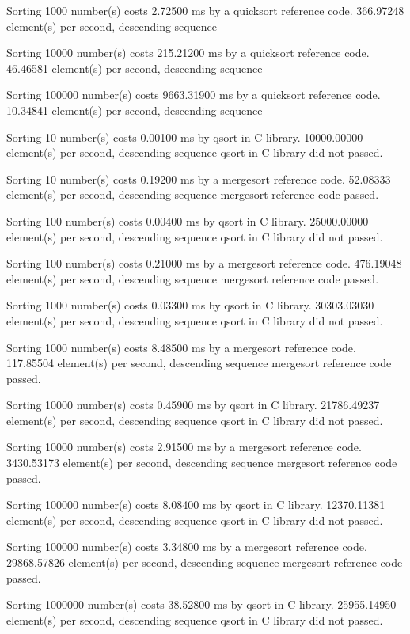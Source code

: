 \documentclass[12pt]{article}
\begin{document}
Sorting 1000 number(s) costs 2.72500 ms by a quicksort reference code. 366.97248 element(s) per second, descending sequence

Sorting 10000 number(s) costs 215.21200 ms by a quicksort reference code. 46.46581 element(s) per second, descending sequence

Sorting 100000 number(s) costs 9663.31900 ms by a quicksort reference code. 10.34841 element(s) per second, descending sequence

Sorting 10 number(s) costs 0.00100 ms by qsort in C library. 10000.00000 element(s) per second, descending sequence
qsort in C library did not passed.

Sorting 10 number(s) costs 0.19200 ms by a mergesort reference code. 52.08333 element(s) per second, descending sequence
mergesort reference code passed.

Sorting 100 number(s) costs 0.00400 ms by qsort in C library. 25000.00000 element(s) per second, descending sequence
qsort in C library did not passed.

Sorting 100 number(s) costs 0.21000 ms by a mergesort reference code. 476.19048 element(s) per second, descending sequence
mergesort reference code passed.

Sorting 1000 number(s) costs 0.03300 ms by qsort in C library. 30303.03030 element(s) per second, descending sequence
qsort in C library did not passed.

Sorting 1000 number(s) costs 8.48500 ms by a mergesort reference code. 117.85504 element(s) per second, descending sequence
mergesort reference code passed.

Sorting 10000 number(s) costs 0.45900 ms by qsort in C library. 21786.49237 element(s) per second, descending sequence
qsort in C library did not passed.

Sorting 10000 number(s) costs 2.91500 ms by a mergesort reference code. 3430.53173 element(s) per second, descending sequence
mergesort reference code passed.

Sorting 100000 number(s) costs 8.08400 ms by qsort in C library. 12370.11381 element(s) per second, descending sequence
qsort in C library did not passed.

Sorting 100000 number(s) costs 3.34800 ms by a mergesort reference code. 29868.57826 element(s) per second, descending sequence
mergesort reference code passed.

Sorting 1000000 number(s) costs 38.52800 ms by qsort in C library. 25955.14950 element(s) per second, descending sequence
qsort in C library did not passed.
\end{document}
